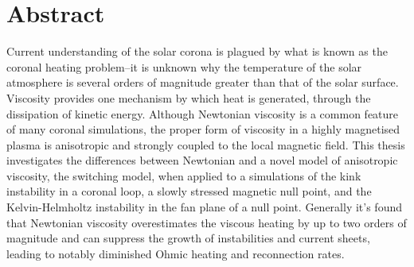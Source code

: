 \chapter{Abstract}

Current understanding of the solar corona is plagued by what is known as the coronal heating problem--it is unknown why the temperature of the solar atmosphere is several orders of magnitude greater than that of the solar surface. Viscosity provides one mechanism by which  heat is generated, through the dissipation of kinetic energy. Although Newtonian viscosity is a common feature of many coronal simulations, the proper form of viscosity in a highly magnetised plasma is anisotropic and strongly coupled to the local magnetic field. This thesis investigates the differences between Newtonian and a novel model of anisotropic viscosity, the switching model, when applied to a simulations of the kink instability in a coronal loop, a slowly stressed magnetic null point, and the Kelvin-Helmholtz instability in the fan plane of a null point. Generally it's found that Newtonian viscosity overestimates the viscous heating by up to two orders of magnitude and can suppress the growth of instabilities and current sheets, leading to notably diminished Ohmic heating and reconnection rates.
